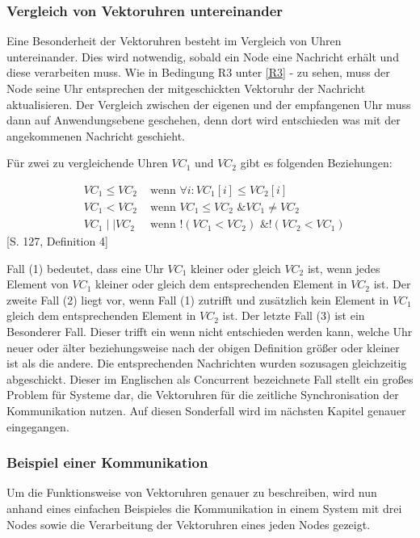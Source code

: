 \subsubsection{Vergleich von Vektoruhren untereinander}
Eine Besonderheit der Vektoruhren besteht im Vergleich von Uhren untereinander. Dies wird notwendig, sobald ein Node eine Nachricht erhält und diese verarbeiten muss. Wie in Bedingung R3 unter \ref{R3} -  zu sehen, muss der Node seine Uhr entsprechen der mitgeschickten Vektoruhr der Nachricht aktualisieren. Der Vergleich zwischen der eigenen und der empfangenen Uhr muss dann auf Anwendungsebene geschehen, denn dort wird entschieden was mit der angekommenen Nachricht geschieht.

Für zwei zu vergleichende Uhren $VC_1$ und $VC_2$ gibt es folgenden Beziehungen:

\begin{eqnarray}
&VC_1 \leq VC_2& \text{ wenn } \forall i : VC_1[i] \leq VC_2[i] \\
	&VC_1 < VC_2& \text{ wenn } VC_1 \leq VC_2 \text{ \& } VC_1 \neq VC_2 \\
	&VC_1 \mid \mid VC_2& \text{ wenn } !(VC_1 < VC_2) \text{ \& } !(VC_2 < VC_1)
\end{eqnarray}
\cite{Mattern88virtualtime}[S. 127, Definition 4]

Fall (1) bedeutet, dass eine Uhr $VC_1$ kleiner oder gleich $VC_2$ ist, wenn jedes Element von $VC_1$ kleiner oder gleich dem entsprechenden Element in $VC_2$ ist. Der zweite Fall (2) liegt vor, wenn Fall (1) zutrifft und zusätzlich kein Element in $VC_1$ gleich dem entsprechenden Element in $VC_2$ ist. 
Der letzte Fall (3) ist ein Besonderer Fall. Dieser trifft ein wenn nicht entschieden werden kann, welche Uhr neuer oder älter beziehungsweise nach der obigen Definition größer oder kleiner ist als die andere. Die entsprechenden Nachrichten wurden sozusagen gleichzeitig abgeschickt. Dieser im Englischen als Concurrent bezeichnete Fall stellt ein großes Problem für Systeme dar, die Vektoruhren für die zeitliche Synchronisation der Kommunikation nutzen. Auf diesen Sonderfall wird im nächsten Kapitel genauer eingegangen.
\subsubsection{Beispiel einer Kommunikation}
Um die Funktionsweise von Vektoruhren genauer zu beschreiben, wird nun anhand eines einfachen Beispieles die Kommunikation in einem System mit drei Nodes sowie die Verarbeitung der Vektoruhren eines jeden Nodes gezeigt.

